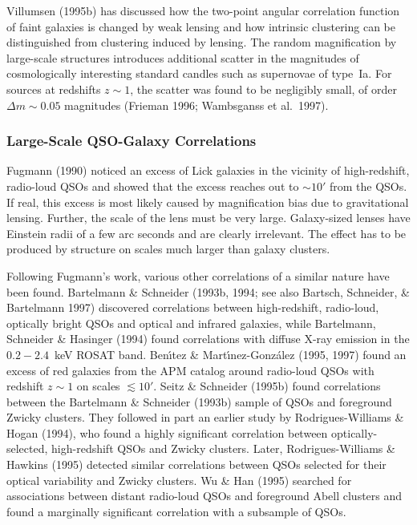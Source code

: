 \documentclass[a4paper,10pt]{article} %
\newcommand{\la}{\lesssim}
\begin{document}
Villumsen (1995b) has discussed how the two-point angular correlation
function of faint galaxies is changed by weak lensing and how
intrinsic clustering can be distinguished from clustering induced by
lensing. The random magnification by large-scale structures introduces
additional scatter in the magnitudes of cosmologically interesting
standard candles such as supernovae of type~Ia. For sources at
redshifts $z\sim1$, the scatter was found to be negligibly small, of
order $\Delta m\sim0.05$ magnitudes (Frieman 1996; Wambsganss et al.\
1997).

\subsubsection{Large-Scale QSO-Galaxy Correlations}
\label{NB:subsubsect4.3.2}

Fugmann (1990) noticed an excess of Lick galaxies in the vicinity of
high-redshift, radio-loud QSOs and showed that the excess reaches out
to $\sim10'$ from the QSOs. If real, this excess is most likely caused
by magnification bias due to gravitational lensing. Further, the scale
of the lens must be very large. Galaxy-sized lenses have Einstein
radii of a few arc seconds and are clearly irrelevant. The effect has
to be produced by structure on scales much larger than galaxy
clusters.

Following Fugmann's work, various other correlations of a similar
nature have been found. Bartelmann \& Schneider (1993b, 1994; see also
Bartsch, Schneider, \& Bartelmann 1997) discovered correlations
between high-redshift, radio-loud, optically bright QSOs and optical
and infrared galaxies, while Bartelmann, Schneider \& Hasinger (1994)
found correlations with diffuse X-ray emission in the $0.2-2.4$~keV
ROSAT band. Ben{\'\i}tez \& Mart{\'\i}nez-Gonz\'alez (1995, 1997)
found an excess of red galaxies from the APM catalog around radio-loud
QSOs with redshift $z\sim1$ on scales $\la10'$. Seitz \& Schneider
(1995b) found correlations between the Bartelmann \& Schneider (1993b)
sample of QSOs and foreground Zwicky clusters. They followed in part
an earlier study by Rodrigues-Williams \& Hogan (1994), who found a
highly significant correlation between optically-selected,
high-redshift QSOs and Zwicky clusters. Later, Rodrigues-Williams \&
Hawkins (1995) detected similar correlations between QSOs selected for
their optical variability and Zwicky clusters. Wu \& Han (1995)
searched for associations between distant radio-loud QSOs and
foreground Abell clusters and found a marginally significant
correlation with a subsample of QSOs.
\end{document}
